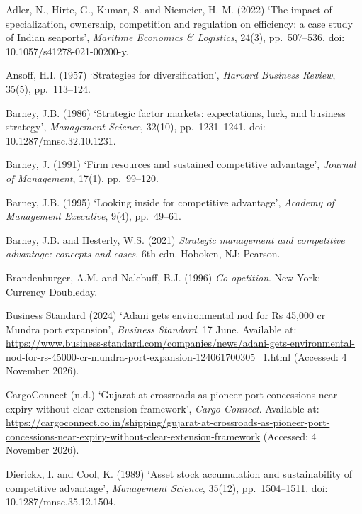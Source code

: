\documentclass[12pt, a4paper]{article}
\begin{document}
\begin{list}{}{\setlength{\leftmargin}{8mm}\setlength{\itemindent}{-8mm}
               \setlength{\itemsep}{1.1ex}\setlength{\parsep}{0pt}
               \setlength{\topsep}{0pt}}
\item Adler, N., Hirte, G., Kumar, S. and Niemeier, H.-M. (2022) `The impact of specialization, ownership, competition and regulation on efficiency: a case study of Indian seaports', \textit{Maritime Economics \& Logistics}, 24(3), pp.~507--536. doi: 10.1057/s41278-021-00200-y.

\item Ansoff, H.I. (1957) `Strategies for diversification', \textit{Harvard Business Review}, 35(5), pp.~113--124.

\item Barney, J.B. (1986) `Strategic factor markets: expectations, luck, and business strategy', \textit{Management Science}, 32(10), pp.~1231--1241. doi: 10.1287/mnsc.32.10.1231.

\item Barney, J. (1991) `Firm resources and sustained competitive advantage', \textit{Journal of Management}, 17(1), pp.~99--120.

\item Barney, J.B. (1995) `Looking inside for competitive advantage', \textit{Academy of Management Executive}, 9(4), pp.~49--61.

\item Barney, J.B. and Hesterly, W.S. (2021) \textit{Strategic management and competitive advantage: concepts and cases}. 6th edn. Hoboken, NJ: Pearson.

\item Brandenburger, A.M. and Nalebuff, B.J. (1996) \textit{Co-opetition}. New York: Currency Doubleday.

\item Business Standard (2024) `Adani gets environmental nod for Rs 45,000 cr Mundra port expansion', \textit{Business Standard}, 17 June. Available at: \url{https://www.business-standard.com/companies/news/adani-gets-environmental-nod-for-rs-45000-cr-mundra-port-expansion-124061700305_1.html} (Accessed: 4 November 2026).

\item CargoConnect (n.d.) `Gujarat at crossroads as pioneer port concessions near expiry without clear extension framework', \textit{Cargo Connect}. Available at: \url{https://cargoconnect.co.in/shipping/gujarat-at-crossroads-as-pioneer-port-concessions-near-expiry-without-clear-extension-framework} (Accessed: 4 November 2026).

\item Dierickx, I. and Cool, K. (1989) `Asset stock accumulation and sustainability of competitive advantage', \textit{Management Science}, 35(12), pp.~1504--1511. doi: 10.1287/mnsc.35.12.1504.


\end{list}
\end{document}
